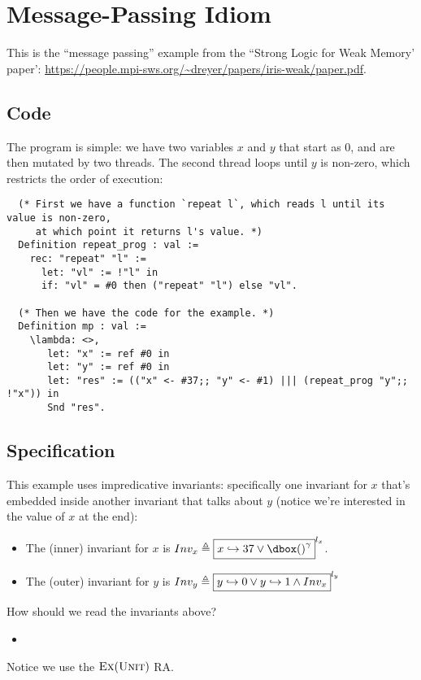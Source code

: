 \section{Message-Passing Idiom}
\label{message-passing-idiom}


This is the ``message passing'' example from the ``Strong Logic for Weak Memory' paper': \url{https://people.mpi-sws.org/~dreyer/papers/iris-weak/paper.pdf}.


\subsection{Code}

The program is simple: we have two variables $x$ and $y$ that start as $0$, and are then mutated by two threads. The second thread loops until $y$ is non-zero, which restricts the order of execution:

\begin{verbatim}
  (* First we have a function `repeat l`, which reads l until its value is non-zero,
     at which point it returns l's value. *)
  Definition repeat_prog : val :=
    rec: "repeat" "l" :=
      let: "vl" := !"l" in
      if: "vl" = #0 then ("repeat" "l") else "vl".

  (* Then we have the code for the example. *)
  Definition mp : val :=
    \lambda: <>,
       let: "x" := ref #0 in
       let: "y" := ref #0 in
       let: "res" := (("x" <- #37;; "y" <- #1) ||| (repeat_prog "y";; !"x")) in
       Snd "res".
\end{verbatim}

\subsection{Specification}

This example uses impredicative invariants: specifically one invariant for $x$ that's embedded inside another invariant that talks about $y$ (notice we're interested in the value of $x$ at the end):
\begin{itemize}
\item The (inner) invariant for $x$ is $Inv_x \triangleq \inv{$\pointsto{x}{37} \lor \ownr{()}{\gamma}$}{l_x}$.

\item The (outer) invariant for $y$ is $Inv_y \triangleq \fbox{$y \hookrightarrow 0 \lor y \hookrightarrow 1 \land  Inv_x$}^{l_y}$
\end{itemize}

How should we read the invariants above?
\begin{itemize}
\item 
\end{itemize}

Notice we use the $\textsc{Ex}(\textsc{Unit})$ RA.